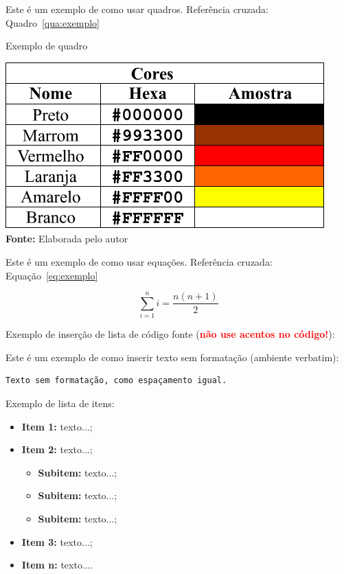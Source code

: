 Este é um exemplo de como usar quadros. Referência cruzada: Quadro~\ref{qua:exemplo}

\FloatBarrier
\begin{quadro}[!htbp]
	\centering
	\caption{Exemplo de quadro}
	\includegraphics[scale=.7]{imagens/exemploQuadro}
	\\\textbf{Fonte:} Elaborada pelo autor
	\label{qua:exemplo}
\end{quadro}
\FloatBarrier


Este é um exemplo de como usar equações. Referência cruzada: Equação~\ref{eq:exemplo}

\begin{equation}
\sum_{i=1}^{n} i = \frac{n(n+1)}{2}
\label{eq:exemplo}
\end{equation}


Exemplo de inserção de lista de código fonte (\textbf{\textcolor{red}{não use acentos no código!}}):

 



Este é um exemplo de como inserir texto sem formatação (ambiente verbatim):

\begin{verbatim}
Texto sem formatação, como espaçamento igual.
\end{verbatim}


Exemplo de lista de itens:

\begin{itemize}
	\item \textbf{Item 1:} texto...;
	\item \textbf{Item 2:} texto...;
	\begin{itemize}
		\item \textbf{Subitem:} texto...;
		\item \textbf{Subitem:} texto...;
		\item \textbf{Subitem:} texto...;
	\end{itemize}
	\item \textbf{Item 3:} texto...;
	\item \textbf{Item n:} texto....
\end{itemize}



